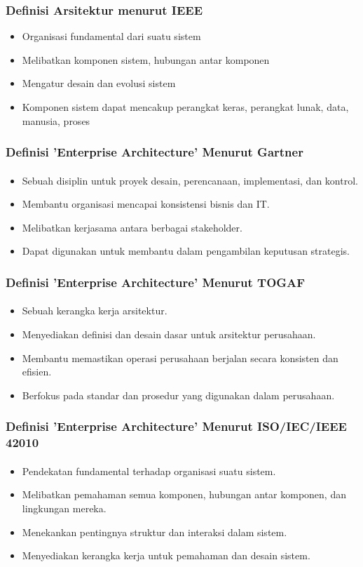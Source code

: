 \documentclass[aspectratio=169, table]{beamer}
\begin{document}
	\begin{frame}
		\frametitle{Definisi Arsitektur menurut IEEE}
		\begin{itemize}
			\item Organisasi fundamental dari suatu sistem
			\item Melibatkan komponen sistem, hubungan antar komponen
			\item Mengatur desain dan evolusi sistem
			\item Komponen sistem dapat mencakup perangkat keras, perangkat lunak, data, manusia, proses
		\end{itemize}
	\end{frame}



	\begin{frame}
		\frametitle{Definisi 'Enterprise Architecture' Menurut Gartner}
        \framesubtitle{\hspace{1cm}}
		\begin{itemize}
			\item Sebuah disiplin untuk proyek desain, perencanaan, implementasi, dan kontrol.
			\item Membantu organisasi mencapai konsistensi bisnis dan IT.
			\item Melibatkan kerjasama antara berbagai stakeholder.
			\item Dapat digunakan untuk membantu dalam pengambilan keputusan strategis.
		\end{itemize}
	\end{frame}

	\begin{frame}
		\frametitle{Definisi 'Enterprise Architecture' Menurut TOGAF}
        \framesubtitle{\hspace{1cm}}
		\begin{itemize}
			\item Sebuah kerangka kerja arsitektur.
			\item Menyediakan definisi dan desain dasar untuk arsitektur perusahaan.
			\item Membantu memastikan operasi perusahaan berjalan secara konsisten dan efisien.
			\item Berfokus pada standar dan prosedur yang digunakan dalam perusahaan.
		\end{itemize}
	\end{frame}

	\begin{frame}
		\frametitle{Definisi 'Enterprise Architecture' Menurut ISO/IEC/IEEE 42010}
        \framesubtitle{\hspace{1cm}}
		\begin{itemize}
			\item Pendekatan fundamental terhadap organisasi suatu sistem.
			\item Melibatkan pemahaman semua komponen, hubungan antar komponen, dan lingkungan mereka.
			\item Menekankan pentingnya struktur dan interaksi dalam sistem.
			\item Menyediakan kerangka kerja untuk pemahaman dan desain sistem.
		\end{itemize}
	\end{frame}
\end{document}
